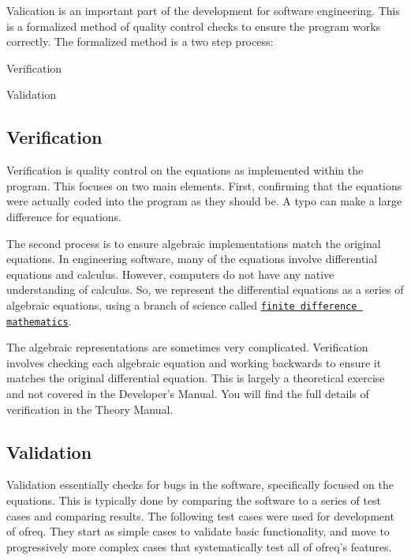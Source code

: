 Valication is an important part of the development for software engineering. This is a formalized method of quality control checks to ensure the program works correctly. The formalized method is a two step process\-:


\begin{DoxyEnumerate}
\item Verification
\item Validation
\end{DoxyEnumerate}

\subsection*{Verification}

Verification is quality control on the equations as implemented within the program. This focuses on two main elements. First, confirming that the equations were actually coded into the program as they should be. A typo can make a large difference for equations.

The second process is to ensure algebraic implementations match the original equations. In engineering software, many of the equations involve differential equations and calculus. However, computers do not have any native understanding of calculus. So, we represent the differential equations as a series of algebraic equations, using a branch of science called \href{http://en.wikipedia.org/wiki/Finite_difference}{\tt finite difference mathematics}.

The algebraic representations are sometimes very complicated. Verification involves checking each algebraic equation and working backwards to ensure it matches the original differential equation. This is largely a theoretical exercise and not covered in the Developer's Manual. You will find the full details of verification in the Theory Manual.

\subsection*{Validation}

Validation essentially checks for bugs in the software, specifically focused on the equations. This is typically done by comparing the software to a series of test cases and comparing results. The following test cases were used for development of ofreq. They start as simple cases to validate basic functionality, and move to progressively more complex cases that systematically test all of ofreq's features.

